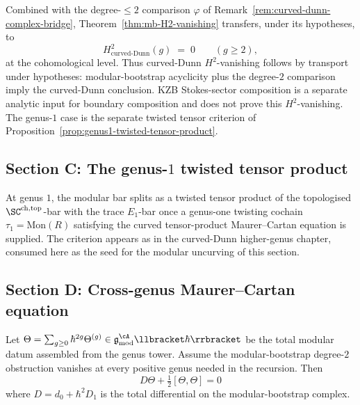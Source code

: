 \begin{remark}
\label{rem:mb-to-curved-dunn-consequence}
Combined with the degree-\(\le2\) comparison \(\varphi\) of
Remark~\ref{rem:curved-dunn-complex-bridge},
Theorem~\ref{thm:mb-H2-vanishing} transfers, under its hypotheses, to
\[
 H^2_{\mathrm{curved\text{-}Dunn}}(g) \;=\; 0
 \qquad (g \ge 2),
\]
at the cohomological level. Thus curved-Dunn \(H^2\)-vanishing follows
by transport under hypotheses: modular-bootstrap acyclicity plus the
degree-\(2\) comparison imply the curved-Dunn conclusion. KZB
Stokes-sector composition is a separate analytic input for boundary
composition and does not prove this \(H^2\)-vanishing. The genus-\(1\)
case is the separate twisted tensor criterion of
Proposition~\ref{prop:genus1-twisted-tensor-product}.
\end{remark}

\subsection{Section C: The genus-$1$ twisted tensor product}
\label{subsec:prop-genus1-twisted}

At genus $1$, the modular bar splits as a twisted tensor product
of the topologised $\SC^{\mathrm{ch,top}}$-bar with the trace
$E_1$-bar once a genus-one twisting cochain
\(\tau_1=\mathrm{Mon}(R)\) satisfying the curved tensor-product
Maurer--Cartan equation is supplied. The criterion appears as
 in the curved-Dunn
higher-genus chapter, consumed here as the
seed for the modular uncurving of this section.

\subsection{Section D: Cross-genus Maurer--Cartan equation}
\label{subsec:cross-genus-mc}

\begin{theorem}
\label{thm:cross-genus-mc}

Let $\Theta = \sum_{g \ge 0} \hbar^{2g} \Theta^{(g)}
\in \mathfrak{g}^{\cA}_{\mathrm{mod}}\llbracket \hbar \rrbracket$
be the total modular datum assembled from the genus tower. Assume the
modular-bootstrap degree-\(2\) obstruction vanishes at every positive
genus needed in the recursion. Then
\[
 D\Theta + \tfrac{1}{2}[\Theta, \Theta] = 0
\]
where $D = d_0 + \hbar^2 D_1$ is the total differential on the
modular-bootstrap complex.
\end{theorem}

